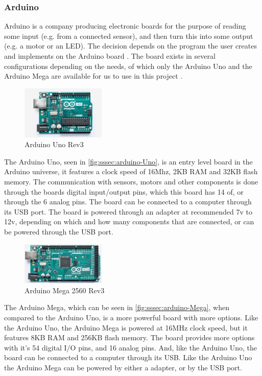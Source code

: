 \subsubsection{Arduino}
Arduino is a company producing electronic boards for the purpose of reading some input (e.g. from a connected sensor), and then turn this into some output (e.g. a motor or an LED).
The decision depends on the program the user creates and implements on the Arduino board \cite{arduino_arduino_nodate}.
The board exists in several configurations depending on the needs, of which only the Arduino Uno and the Arduino Mega are available for us to use in this project \cite{arduino_arduino_products}.

\begin{figure}[H]
  \centering
  \includegraphics[width=4cm]{images/techAnalysis/ArduinoUno.jpg}
  \caption{Arduino Uno Rev3 \cite{Arduino-figure-UNO}}\label{fig:sssec:arduino-Uno}
\end{figure}
The Arduino Uno, seen in \autoref{fig:sssec:arduino-Uno}, is an entry level board in the Arduino universe, it features a clock speed of 16Mhz, 2KB RAM and 32KB flash memory.
The communication with sensors, motors and other components is done through the boards digital input/output pins, which this board has 14 of, or through the 6 analog pins.
The board can be connected to a computer through its USB port.
The board is powered through an adapter at recommended 7v to 12v, depending on which and how many components that are connected, or can be powered through the USB port.
\cite{arduino_arduino_UNO}

\begin{figure}[H]
  \centering
  \includegraphics[width=4cm]{images/techAnalysis/ArduinoMega.jpg}
  \caption{Arduino Mega 2560 Rev3 \cite{Arduino-figure-MEGA}}\label{fig:sssec:arduino-Mega}
\end{figure}
The Arduino Mega, which can be seen in \autoref{fig:sssec:arduino-Mega}, when compared to the Arduino Uno, is a more powerful board with more options.
Like the Arduino Uno, the Arduino Mega is powered at 16MHz clock speed, but it features 8KB RAM and 256KB flash memory.
The board provides more options with it's 54 digital I/O pins, and 16 analog pins.
And, like the Arduino Uno, the board can be connected to a computer through its USB.
Like the Arduino Uno the Arduino Mega can be powered by either a adapter, or by the USB port.
\cite{arduino_arduino_MEGA}

